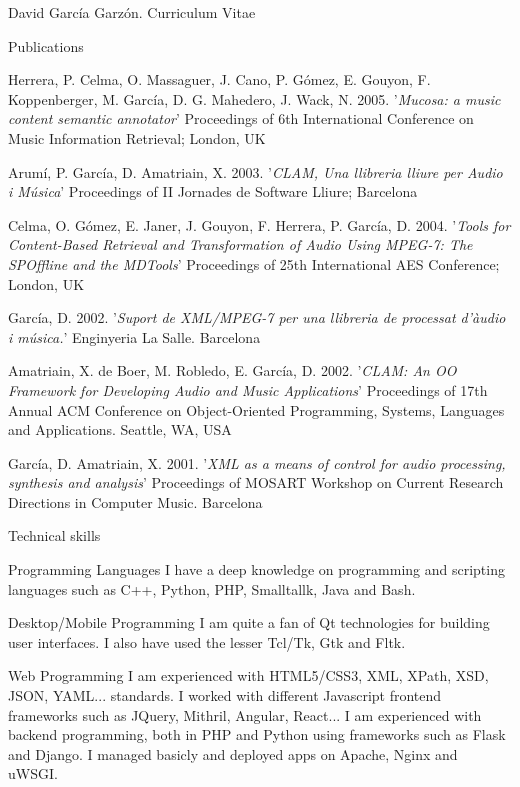 \documentclass{article}
\begin{document}
\begin{cv}{David García Garzón. Curriculum Vitae}
\begin{cvlist}{Publications}
\item[] {\sc Herrera, P. Celma, O. Massaguer, J. Cano, P. Gómez, E. Gouyon, F. Koppenberger, M. García, D. G. Mahedero, J. Wack, N.} 2005.
'{\em Mucosa: a music content semantic annotator}'
Proceedings of 6th International Conference on Music Information Retrieval; London, UK

\item[] {\sc Arumí, P. García, D. Amatriain, X.} 2003.
'{\em CLAM, Una llibreria lliure per Audio i Música}'
Proceedings of II Jornades de Software Lliure; Barcelona

\item[] {\sc Celma, O. Gómez, E. Janer, J. Gouyon, F. Herrera, P. García, D.} 2004.
'{\em Tools for Content-Based Retrieval and Transformation of Audio Using MPEG-7: The SPOffline and the MDTools}'
Proceedings of 25th International AES Conference; London, UK

\item[] {\sc García, D.} 2002.
'{\em Suport de XML/MPEG-7 per una llibreria de processat d'àudio i música.}'
Enginyeria La Salle. Barcelona

\item[] {\sc Amatriain, X. de Boer, M. Robledo, E. García, D.} 2002.
'{\em CLAM: An OO Framework for Developing Audio and Music Applications}'
Proceedings of 17th Annual ACM Conference on Object-Oriented Programming, Systems, Languages and Applications. Seattle, WA, USA

\item[] {\sc García, D. Amatriain, X.} 2001.
'{\em XML as a means of control for audio processing, synthesis and analysis}'
Proceedings of MOSART Workshop on Current Research Directions in Computer Music. Barcelona
	
\end{cvlist}


\begin{cvlist}{Technical skills}

\item[Programming Languages]
	I have a deep knowledge on programming and scripting languages
such  as C++, Python, PHP, Smalltallk, Java and Bash.


\item[Desktop/Mobile Programming]
	I am quite a fan of Qt technologies for building user interfaces.
I also have used the lesser Tcl/Tk, Gtk and Fltk.


\item[Web Programming]
	I am experienced with HTML5/CSS3, XML, XPath, XSD, JSON, YAML... standards.
I worked with different Javascript frontend frameworks such as JQuery, Mithril, Angular, React...
I am experienced with backend programming, both in PHP and Python using frameworks such as Flask and Django.
I managed basicly and deployed apps on Apache, Nginx and uWSGI.



\end{cvlist}
\end{cv}
\end{document}
